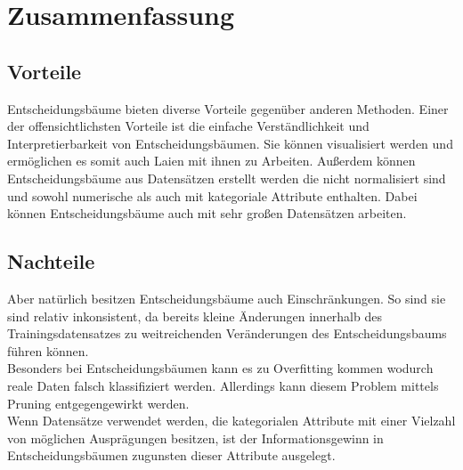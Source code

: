 \chapter{Zusammenfassung}
\label{zusammenfassung}

\section{Vorteile}
\label{vorteile}
Entscheidungsbäume bieten diverse Vorteile gegenüber anderen Methoden. Einer der offensichtlichsten Vorteile ist die einfache Verständlichkeit und Interpretierbarkeit von Entscheidungsbäumen. \autocite{DataMining} Sie können visualisiert werden und ermöglichen es somit auch Laien mit ihnen zu Arbeiten. \autocite{PythonCourseDecisionTrees:online} Außerdem können Entscheidungsbäume aus Datensätzen erstellt werden die nicht normalisiert sind und sowohl numerische als auch mit kategoriale Attribute enthalten. Dabei können Entscheidungsbäume auch mit sehr großen Datensätzen arbeiten. \autocite{PythonCourseDecisionTrees:online}\\

\section{Nachteile}
\label{nachteile}
Aber natürlich besitzen Entscheidungsbäume auch Einschränkungen. So sind sie sind relativ inkonsistent, da bereits kleine Änderungen innerhalb des Trainingsdatensatzes zu weitreichenden Veränderungen des Entscheidungsbaums führen können. \autocite{PythonCourseDecisionTrees:online}\\
Besonders bei Entscheidungsbäumen kann es zu Overfitting kommen wodurch reale Daten falsch klassifiziert werden. Allerdings kann diesem Problem mittels Pruning entgegengewirkt werden. \autocite{DataMining}\\
Wenn Datensätze verwendet werden, die kategorialen Attribute mit einer Vielzahl von möglichen Ausprägungen besitzen, ist der Informationsgewinn in Entscheidungsbäumen zugunsten dieser Attribute ausgelegt.\autocite{PythonCourseDecisionTrees:online}